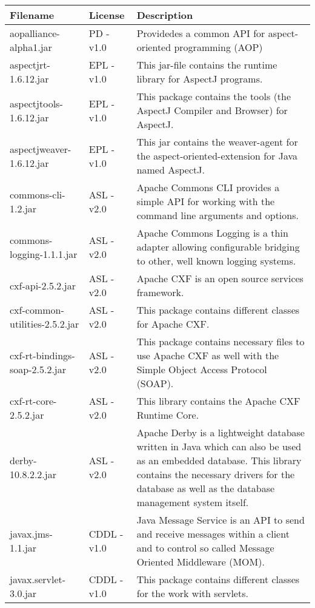 \begin{center}
\begin{longtable}{|p{}|p{}|p{}|}
\hline 
Filename & License & Description\\
\hline
\hline 
aopalliance-alpha1.jar & PD - v1.0 & Providedes a common API for aspect-oriented programming (AOP)\\
\hline 
aspectjrt-1.6.12.jar & EPL - v1.0 & This jar-file contains the runtime library for AspectJ programs.\\
\hline 
aspectjtools-1.6.12.jar & EPL - v1.0 & This package contains the tools (the AspectJ Compiler and Browser) for AspectJ.\\
\hline 
aspectjweaver-1.6.12.jar & EPL - v1.0 & This jar contains the weaver-agent for the aspect-oriented-extension for Java named AspectJ.\\
\hline 
commons-cli-1.2.jar & ASL - v2.0 & Apache Commons CLI provides a simple API for working with the command line arguments and options.\\
\hline 
commons-logging-1.1.1.jar & ASL - v2.0 & Apache Commons Logging is a thin adapter allowing configurable bridging to other, well known logging systems.\\
\hline 
cxf-api-2.5.2.jar & ASL - v2.0 & Apache CXF is an open source services framework.\\
\hline 
cxf-common-utilities-2.5.2.jar & ASL - v2.0 & This package contains different classes for Apache CXF.\\
\hline 
cxf-rt-bindings-soap-2.5.2.jar & ASL - v2.0 & This package contains necessary files to use Apache CXF as well with the Simple Object Access Protocol (SOAP).\\
\hline 
cxf-rt-core-2.5.2.jar & ASL - v2.0 & This library contains the Apache CXF Runtime Core.\\
\hline 
derby-10.8.2.2.jar & ASL - v2.0 & Apache Derby is a lightweight database written in Java which can also be used as an embedded database. This library contains the necessary drivers for the database as well as the database management system itself.\\
\hline 
javax.jms-1.1.jar & CDDL - v1.0 & Java Message Service is an API to send and receive messages within a client and to control so called Message Oriented Middleware (MOM).\\
\hline 
javax.servlet-3.0.jar & CDDL - v1.0 & This package contains different classes for the work with servlets.\\
\hline 

\end{longtable}
\end{center}
